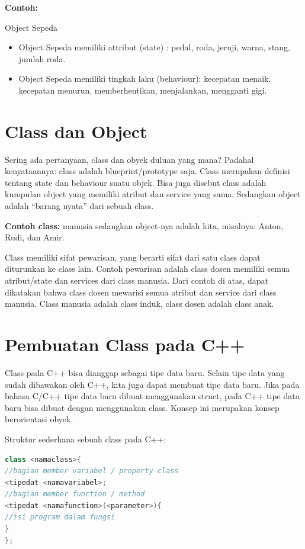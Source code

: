 \textbf{Contoh:}

Object Sepeda

\begin{itemize}
\tightlist
\item
  Object Sepeda memiliki attribut (state) : pedal, roda, jeruji, warna,
  stang, jumlah roda.
\item
  Object Sepeda memiliki tingkah laku (behaviour): kecepatan menaik,
  kecepatan menurun, memberhentikan, menjalankan, mengganti gigi.
\end{itemize}

\section{Class dan Object}\label{class-dan-object-1}

Sering ada pertanyaan, class dan obyek duluan yang mana? Padahal
kenyataannya: class adalah blueprint/prototype saja. Class merupakan
definisi tentang state dan behaviour suatu objek. Bisa juga disebut
class adalah kumpulan object yang memiliki atribut dan service yang
sama. Sedangkan object adalah ``barang nyata'' dari sebuah class.

\textbf{Contoh class:} manusia sedangkan object-nya adalah kita, misalnya: Anton,
Rudi, dan Amir.

Class memiliki sifat pewarisan, yang berarti sifat dari satu class dapat
diturunkan ke class lain. Contoh pewarisan adalah class dosen memiliki
semua atribut/state dan services dari class manusia. Dari contoh di
atas, dapat dikatakan bahwa class dosen mewarisi semua atribut dan
service dari class manusia. Class manusia adalah class induk, class
dosen adalah class anak.

\section{Pembuatan Class pada C++}\label{pembuatan-class-pada-c}

Class pada C++ bisa dianggap sebagai tipe data baru. Selain tipe data
yang sudah dibawakan oleh C++, kita juga dapat membuat tipe data baru.
Jika pada bahasa C/C++ tipe data baru dibuat menggunakan struct, pada
C++ tipe data baru bisa dibuat dengan menggunakan class. Konsep ini
merupakan konsep berorientasi obyek.

Struktur sederhana sebuah class pada C++:

\begin{lstlisting}[language=c++, caption=struktur sederhana class pada c++]
class <namaclass>{
//bagian member variabel / property class
<tipedat <namavariabel>;
//bagian member function / method
<tipedat <namafunction>(<parameter>){
//isi program dalam fungsi
}
};
\end{lstlisting}

